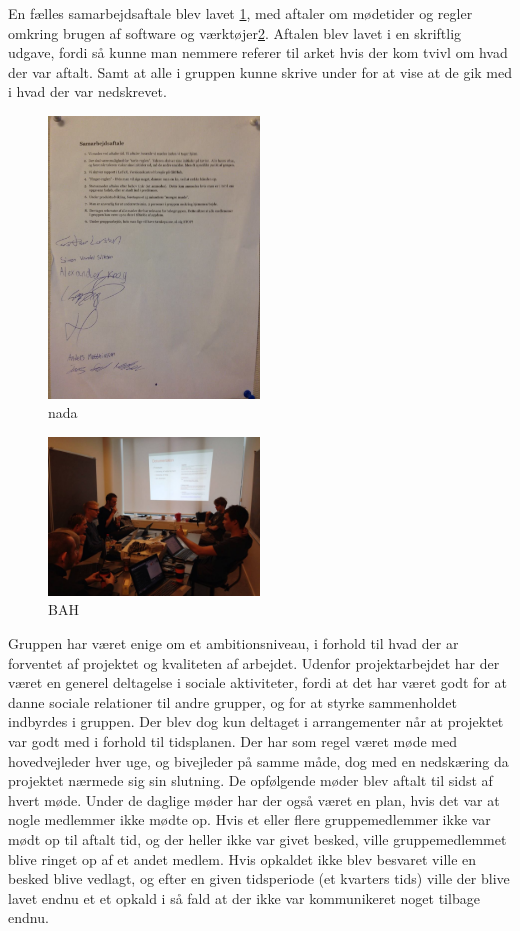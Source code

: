 En fælles samarbejdsaftale blev lavet \cref{SAftale}, med aftaler om mødetider og regler omkring brugen af software og værktøjer\ref{4}. Aftalen blev lavet i en skriftlig udgave, fordi så kunne man nemmere referer til arket hvis der kom tvivl om hvad der var aftalt. Samt at alle i gruppen kunne skrive under for at vise at de gik med i hvad der var nedskrevet.

\begin{figure}[ht!]
  \centering
  \includegraphics[width=0.5\textwidth]{Images/S_Aftale.jpg}
  \caption{nada}
  \label{SAftale}
\end{figure}

\begin{figure}[ht!]
    \centering
    \includegraphics[width=0.5\textwidth]{Images/8.jpg}
    \caption{BAH}
    \label{4}
\end{figure}
Gruppen har været enige om et ambitionsniveau, i forhold til hvad der ar forventet af projektet og kvaliteten af arbejdet. Udenfor projektarbejdet har der været en generel deltagelse i sociale aktiviteter, fordi at det har været godt for at danne sociale relationer til andre grupper, og for at styrke sammenholdet indbyrdes i gruppen. Der blev dog kun deltaget i arrangementer når at projektet var godt med i forhold til tidsplanen. 
Der har som regel været møde med hovedvejleder hver uge, og bivejleder på samme måde, dog med en nedskæring da projektet nærmede sig sin slutning. De opfølgende møder blev aftalt til sidst af hvert møde. Under de daglige møder har der også været en plan, hvis det var at nogle medlemmer ikke mødte op. Hvis et eller flere gruppemedlemmer ikke var mødt op til aftalt tid, og der heller ikke var givet besked, ville gruppemedlemmet blive ringet op af et andet medlem. Hvis opkaldet ikke blev besvaret ville en besked blive vedlagt, og efter en given tidsperiode (et kvarters tids) ville der blive lavet endnu et et opkald i så fald at der ikke var kommunikeret noget tilbage endnu. 

